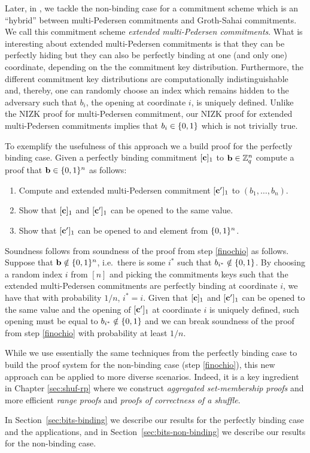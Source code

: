 Later, in \cite{ACNS:GonRaf16}, we tackle the non-binding case for a commitment scheme which is an ``hybrid'' between multi-Pedersen commitments and Groth-Sahai commitments. We call this commitment scheme \emph{extended multi-Pedersen commitments}. What is interesting about extended multi-Pedersen commitments is that they can be perfectly hiding but they can also be perfectly binding at one (and only one) coordinate, depending on the the commitment key distribution. Furthermore, the different commitment key distributions are computationally indistinguishable and, thereby, one can randomly choose an index which remains hidden to the adversary such that $b_i$, the opening at coordinate $i$, is uniquely defined. Unlike the NIZK proof for multi-Pedersen commitment, our NIZK proof for extended multi-Pedersen commitments implies that $b_i\in\{0,1\}$ which is not trivially true.

To exemplify the usefulness of this approach we a build proof for the perfectly binding case. Given a perfectly binding commitment $[\mathbf{c}]_1$ to $\mathbf{b}\in\mathbb{Z}_q^n$ compute a proof that $\mathbf{b}\in\{0,1\}^n$ as follows:
\begin{enumerate}
\item Compute and extended multi-Pedersen commitment $[\mathbf{c}']_1$ to $(b_1,\ldots,b_n)$.
\item Show that $[\mathbf{c}]_1$ and $[\mathbf{c}']_1$  can be opened to the same value.
\item Show that $[\mathbf{c}']_1$ can be opened to and element from $\{0,1\}^n$. \label{finochio}
\end{enumerate}
Soundness follows from soundness of the proof from step \ref{finochio} as follows. Suppose that $\mathbf{b}\notin \{0,1\}^n$, i.e.~there is some $i^*$ such that $b_{i^*}\notin\{0,1\}$. By choosing a random index $i$ from $[n]$ and picking the commitments keys such that the extended multi-Pedersen commitments are perfectly binding at coordinate $i$, we have that with probability $1/n$, $i^*=i$. Given that $[\mathbf{c}]_1$ and $[\mathbf{c}']_1$ can be opened to the same value and the opening of $[\mathbf{c}']_1$ at coordinate $i$ is uniquely defined, such opening must be equal to $b_{i^*}\notin\{0,1\}$ and we can break soundness of the proof from step \ref{finochio} with probability at least $1/n$.
 
While we use essentially the same techniques from the perfectly binding case to build the proof system for the non-binding case (step \ref{finochio}), this new approach can be applied to more diverse scenarios. Indeed, it is a key ingredient in Chapter \ref{sec:shuf-rp} where we construct \emph{aggregated set-membership proofs} and more efficient \emph{range proofs} and \emph{proofs of correctness of a shuffle}.

In Section~\ref{sec:bits-binding} we describe our results for the perfectly binding case and the applications, and in Section~\ref{sec:bits-non-binding} we describe our results for the non-binding case.
